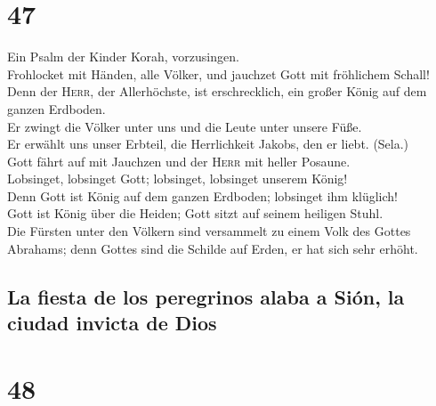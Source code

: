 \hypertarget{section-46}{%
\section{47}\label{section-46}}

 Ein Psalm der Kinder Korah, vorzusingen.\\
 Frohlocket mit Händen, alle Völker, und jauchzet Gott mit
fröhlichem Schall!\\
 Denn der \textsc{Herr}, der Allerhöchste, ist
erschrecklich, ein großer König auf dem ganzen Erdboden.\\
 Er zwingt die Völker unter uns und die Leute unter unsere
Füße.\\
 Er erwählt uns unser Erbteil, die Herrlichkeit Jakobs,
den er liebt. (Sela.)\\
 Gott fährt auf mit Jauchzen und der \textsc{Herr} mit
heller Posaune.\\
 Lobsinget, lobsinget Gott; lobsinget, lobsinget unserem
König!\\
 Denn Gott ist König auf dem ganzen Erdboden; lobsinget
ihm klüglich!\\
 Gott ist König über die Heiden; Gott sitzt auf seinem
heiligen Stuhl.\\
 Die Fürsten unter den Völkern sind versammelt zu einem
Volk des Gottes Abrahams; denn Gottes sind die Schilde auf Erden, er hat
sich sehr erhöht.

\hypertarget{la-fiesta-de-los-peregrinos-alaba-a-siuxf3n-la-ciudad-invicta-de-dios}{%
\subsection{La fiesta de los peregrinos alaba a Sión, la ciudad invicta
de
Dios}\label{la-fiesta-de-los-peregrinos-alaba-a-siuxf3n-la-ciudad-invicta-de-dios}}

\hypertarget{section-47}{%
\section{48}\label{section-47}}

